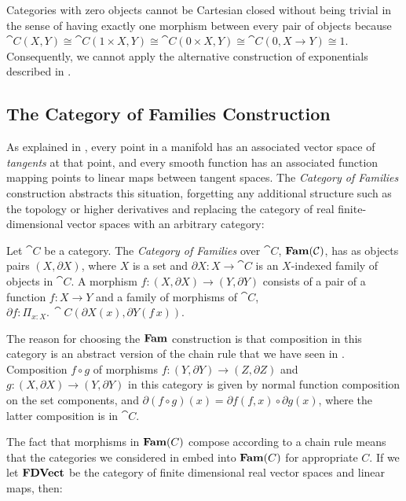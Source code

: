 \begin{remark}
  \label{rem:biproduct-not-closed}
  Categories with zero objects cannot be Cartesian closed without
  being trivial in the sense of having exactly one morphism between
  every pair of objects because
  $\cat{C}(X, Y) \cong \cat{C}(1 \times X,Y) \cong \cat{C}(0 \times
  X,Y) \cong \cat{C}(0,X \to Y) \cong 1$. Consequently, we cannot
  apply the alternative construction of exponentials described in
  .
\end{remark}

\subsection{The Category of Families Construction}
\label{sec:models-of-total-gps:fam}

As explained in , every point
in a manifold has an associated vector space of \emph{tangents} at
that point, and every smooth function has an associated function
mapping points to linear maps between tangent spaces. The
\emph{Category of Families} construction abstracts this situation,
forgetting any additional structure such as the topology or higher
derivatives and replacing the category of real finite-dimensional
vector spaces with an arbitrary category:

\begin{definition}
  Let $\cat{C}$ be a category. The \emph{Category of Families} over
  $\cat{C}$, $\mathbf{Fam}(\mathcal{C})$, has as objects pairs $(X, \partial X)$,
  where $X$ is a set and $\partial X : X \to \cat{C}$ is an
  $X$-indexed family of objects in $\cat{C}$. A morphism
  $f : (X, \partial X) \to (Y, \partial Y)$ consists of a pair of a
  function $f : X \to Y$ and a family of morphisms of $\cat{C}$,
  $\partial f : \Pi_{x : X}.\,\cat{C}(\partial X(x), \partial Y(f\,x))$.
\end{definition}

The reason for choosing the $\mathbf{Fam}$ construction is that composition in
this category is an abstract version of the chain rule that we have
seen in . Composition $f \circ g $ of morphisms
$f : (Y, \partial Y) \to (Z, \partial Z)$ and
$g : (X, \partial X) \to (Y, \partial Y)$ in this category is given by
normal function composition on the set components, and
$\partial (f \circ g)(x) = \partial f(f, x) \circ \partial g(x)$,
where the latter composition is in $\cat{C}$.

The fact that morphisms in $\mathbf{Fam}(C)$ compose according to a chain rule
means that the categories we considered in 
embed into $\mathbf{Fam}(C)$ for appropriate $C$. If we let $\mathbf{FDVect}$ be the
category of finite dimensional real vector spaces and linear maps,
then:

